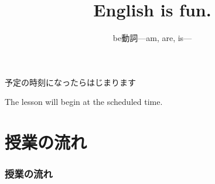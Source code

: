 \documentclass[aspectratio=169,xcolor={dvipsnames,table}]{beamer}
\title{English is fun.}
\subtitle{be動詞---am, are, is---}
\author{}
\institute[]{}
\date[]
\begin{document}
\begin{frame}[label=waiting]{}
\thispagestyle{empty}
\Large
\raggedright

予定の時刻になったらはじまります

\vfill

\raggedleft

The lesson will begin at the scheduled time.
\end{frame}
\begin{frame}[label=title]
\thispagestyle{empty}
\titlepage
\end{frame}
\section*{授業の流れ}
\begin{frame}[plain]
  \frametitle{授業の流れ}
  \tableofcontents
\end{frame}
\end{document}
